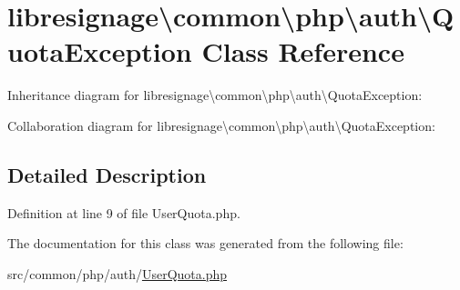 \hypertarget{classlibresignage_1_1common_1_1php_1_1auth_1_1QuotaException}{}\section{libresignage\textbackslash{}common\textbackslash{}php\textbackslash{}auth\textbackslash{}Quota\+Exception Class Reference}
\label{classlibresignage_1_1common_1_1php_1_1auth_1_1QuotaException}


Inheritance diagram for libresignage\textbackslash{}common\textbackslash{}php\textbackslash{}auth\textbackslash{}Quota\+Exception\+:


Collaboration diagram for libresignage\textbackslash{}common\textbackslash{}php\textbackslash{}auth\textbackslash{}Quota\+Exception\+:


\subsection{Detailed Description}


Definition at line 9 of file User\+Quota.\+php.



The documentation for this class was generated from the following file\+:\begin{DoxyCompactItemize}
\item 
src/common/php/auth/\hyperlink{UserQuota_8php}{User\+Quota.\+php}\end{DoxyCompactItemize}
